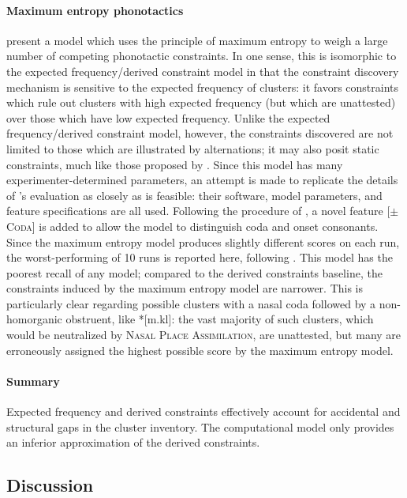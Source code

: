 \paragraph{Maximum entropy phonotactics} 
\citet{Hayes2008a} present a model which uses the principle of maximum entropy to weigh a large number of competing phonotactic constraints. 
In one sense, this is isomorphic to the expected frequency/derived constraint model in that the constraint discovery mechanism is sensitive to the expected frequency of clusters: it favors constraints which rule out clusters with high expected frequency (but which are unattested) over those which have low expected frequency.
Unlike the expected frequency/derived constraint model, however, the constraints discovered are not limited to those which are illustrated by alternations; it may also posit static constraints, much like those proposed by \citet{Pierrehumbert1994}.
Since this model has many experimenter-determined parameters, 
an attempt is made to replicate the details of \citeauthor{Hayes2008a}'s evaluation as closely as is feasible: their software, model parameters, and feature specifications are all used. 
Following the procedure of \citet{HayesInPress}, a novel feature [$\pm$\textsc{Coda}] is added to allow the model to distinguish coda and onset consonants. 
Since the maximum entropy model produces slightly different scores on each run, the worst-performing of 10 runs is reported here, following \citet{Hayes2008a}.
This model has the poorest recall of any model; compared to the derived constraints baseline, the constraints induced by the maximum entropy model are narrower.
This is particularly clear regarding possible clusters with a nasal coda followed by a non-homorganic obstruent, like *[m.kl]: the vast majority of such clusters, which would be neutralized by \textsc{Nasal Place Assimilation}, are unattested, but many are erroneously assigned the highest possible score by the maximum entropy model.

\paragraph{Summary}
Expected frequency and derived constraints effectively account for 
accidental and structural gaps in the cluster inventory.
The \citet{Hayes2008a} computational model only provides an inferior approximation of the derived constraints.

\subsection{Discussion}

